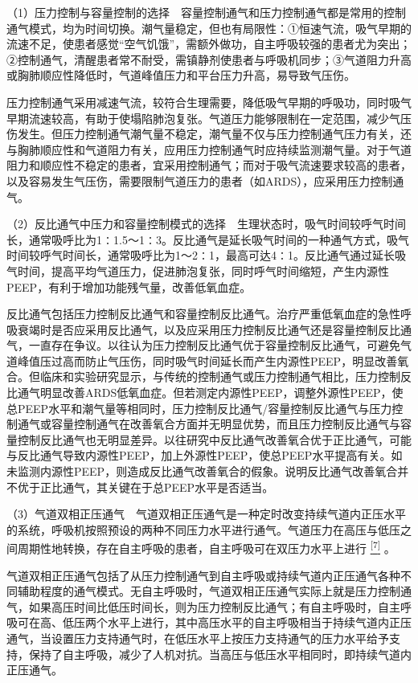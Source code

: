 （1）压力控制与容量控制的选择　容量控制通气和压力控制通气都是常用的控制通气模式，均为时间切换。潮气量稳定，但也有局限性：①恒速气流，吸气早期的流速不足，使患者感觉“空气饥饿”，需额外做功，自主呼吸较强的患者尤为突出；②控制通气，清醒患者常不耐受，需镇静剂使患者与呼吸机同步；③气道阻力升高或胸肺顺应性降低时，气道峰值压力和平台压力升高，易导致气压伤。

压力控制通气采用减速气流，较符合生理需要，降低吸气早期的呼吸功，同时吸气早期流速较高，有助于使塌陷肺泡复张。气道压力能够限制在一定范围，减少气压伤发生。但压力控制通气潮气量不稳定，潮气量不仅与压力控制通气压力有关，还与胸肺顺应性和气道阻力有关，应用压力控制通气时应持续监测潮气量。对于气道阻力和顺应性不稳定的患者，宜采用控制通气；而对于吸气流速要求较高的患者，以及容易发生气压伤，需要限制气道压力的患者（如ARDS），应采用压力控制通气。

（2）反比通气中压力和容量控制模式的选择　生理状态时，吸气时间较呼气时间长，通常吸呼比为1∶1.5～1∶3。反比通气是延长吸气时间的一种通气方式，吸气时间较呼气时间长，通常吸呼比为1～2∶1，最高可达4∶1。反比通气通过延长吸气时间，提高平均气道压力，促进肺泡复张，同时呼气时间缩短，产生内源性PEEP，有利于增加功能残气量，改善低氧血症。

反比通气包括压力控制反比通气和容量控制反比通气。治疗严重低氧血症的急性呼吸衰竭时是否应采用反比通气，以及应采用压力控制反比通气还是容量控制反比通气，一直存在争议。以往认为压力控制反比通气优于容量控制反比通气，可避免气道峰值压过高而防止气压伤，同时吸气时间延长而产生内源性PEEP，明显改善氧合。但临床和实验研究显示，与传统的控制通气或压力控制通气相比，压力控制反比通气明显改善ARDS低氧血症。但若测定内源性PEEP，调整外源性PEEP，使总PEEP水平和潮气量等相同时，压力控制反比通气/容量控制反比通气与压力控制通气或容量控制通气在改善氧合方面并无明显优势，而且压力控制反比通气与容量控制反比通气也无明显差异。以往研究中反比通气改善氧合优于正比通气，可能与反比通气导致内源性PEEP，加上外源性PEEP，使总PEEP水平提高有关。如未监测内源性PEEP，则造成反比通气改善氧合的假象。说明反比通气改善氧合并不优于正比通气，其关键在于总PEEP水平是否适当。

（3）气道双相正压通气　气道双相正压通气是一种定时改变持续气道内正压水平的系统，呼吸机按照预设的两种不同压力水平进行通气。气道压力在高压与低压之间周期性地转换，存在自主呼吸的患者，自主呼吸可在双压力水平上进行
\protect\hyperlink{text00016.htmlux5cux23ch7-15}{\textsuperscript{{[}7{]}}}
。

气道双相正压通气包括了从压力控制通气到自主呼吸或持续气道内正压通气各种不同辅助程度的通气模式。无自主呼吸时，气道双相正压通气实际上就是压力控制通气，如果高压时间比低压时间长，则为压力控制反比通气；有自主呼吸时，自主呼吸可在高、低压两个水平上进行，其中高压水平的自主呼吸相当于持续气道内正压通气，当设置压力支持通气时，在低压水平上按压力支持通气的压力水平给予支持，保持了自主呼吸，减少了人机对抗。当高压与低压水平相同时，即持续气道内正压通气。

